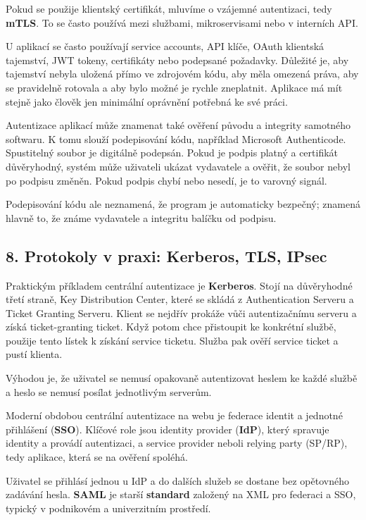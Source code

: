 \documentclass[11pt,a4paper]{article}
\begin{document}
Pokud se použije klientský certifikát, mluvíme o vzájemné autentizaci, tedy \textbf{mTLS}. To se často používá mezi službami, mikroservisami nebo v interních API.

U aplikací se často používají service accounts, API klíče, OAuth klientská tajemství, JWT tokeny, certifikáty nebo podepsané požadavky. Důležité je, aby tajemství nebyla uložená přímo ve zdrojovém kódu, aby měla omezená práva, aby se pravidelně rotovala a aby bylo možné je rychle zneplatnit. Aplikace má mít stejně jako člověk jen minimální oprávnění potřebná ke své práci.

Autentizace aplikací může znamenat také ověření původu a integrity samotného softwaru. K tomu slouží podepisování kódu, například Microsoft Authenticode. Spustitelný soubor je digitálně podepsán. Pokud je podpis platný a certifikát důvěryhodný, systém může uživateli ukázat vydavatele a ověřit, že soubor nebyl po podpisu změněn. Pokud podpis chybí nebo nesedí, je to varovný signál.

Podepisování kódu ale neznamená, že program je automaticky bezpečný; znamená hlavně to, že známe vydavatele a integritu balíčku od podpisu.

\subsection*{8. Protokoly v praxi: Kerberos, TLS, IPsec}

Praktickým příkladem centrální autentizace je \textbf{Kerberos}. Stojí na důvěryhodné třetí straně, Key Distribution Center, které se skládá z Authentication Serveru a Ticket Granting Serveru. Klient se nejdřív prokáže vůči autentizačnímu serveru a získá ticket-granting ticket. Když potom chce přistoupit ke konkrétní službě, použije tento lístek k získání service ticketu. Služba pak ověří service ticket a pustí klienta.

Výhodou je, že uživatel se nemusí opakovaně autentizovat heslem ke každé službě a heslo se nemusí posílat jednotlivým serverům.

Moderní obdobou centrální autentizace na webu je federace identit a jednotné přihlášení (\textbf{SSO}). Klíčové role jsou identity provider (\textbf{IdP}), který spravuje identity a provádí autentizaci, a service provider neboli relying party (SP/RP), tedy aplikace, která se na ověření spoléhá.

Uživatel se přihlásí jednou u IdP a do dalších služeb se dostane bez opětovného zadávání hesla. \textbf{SAML} je starší \textbf{standard} založený na XML pro federaci a SSO, typický v podnikovém a univerzitním prostředí.
\end{document}
